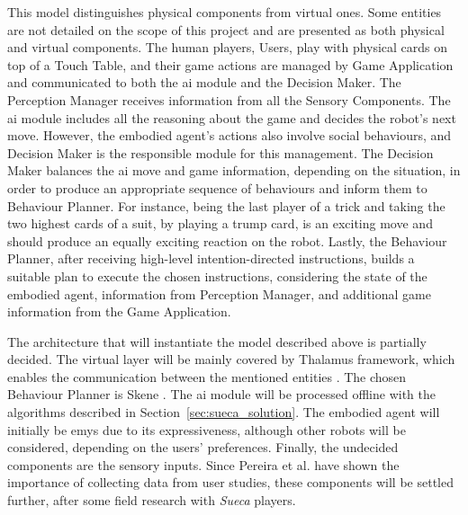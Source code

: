 This model distinguishes physical components from virtual ones.
Some entities are not detailed on the scope of this project and are presented as both physical and virtual components.
The human players, Users, play with physical cards on top of a Touch Table, and their game actions are managed by Game Application and communicated to both the \gls{ai} module and the Decision Maker.
The Perception Manager receives information from all the Sensory Components.
The \gls{ai} module includes all the reasoning about the game and decides the robot's next move.
However, the embodied agent's actions also involve social behaviours, and Decision Maker is the responsible module for this management.
The Decision Maker balances the \gls{ai} move and game information, depending on the situation, in order to produce an appropriate sequence of behaviours and inform them to Behaviour Planner.
For instance, being the last player of a trick and taking the two highest cards of a suit, by playing a trump card, is an exciting move and should produce an equally exciting reaction on the robot.
Lastly, the Behaviour Planner, after receiving high-level intention-directed instructions, builds a suitable plan to execute the chosen instructions, considering the state of the embodied agent, information from Perception Manager, and additional game information from the Game Application.

The architecture that will instantiate the model described above is partially decided.
The virtual layer will be mainly covered by Thalamus framework, which enables the communication between the mentioned entities \cite{Ribeiro}.
The chosen Behaviour Planner is Skene \cite{Ribeiroa}.
The \gls{ai} module will be processed offline with the algorithms described in Section~\ref{sec:sueca_solution}.
The embodied agent will initially be \gls{emys} due to its expressiveness, although other robots will be considered, depending on the users' preferences.
Finally, the undecided components are the sensory inputs.
Since Pereira et al. have shown the importance of collecting data from user studies, these components will be settled further, after some field research with \emph{Sueca} players.









